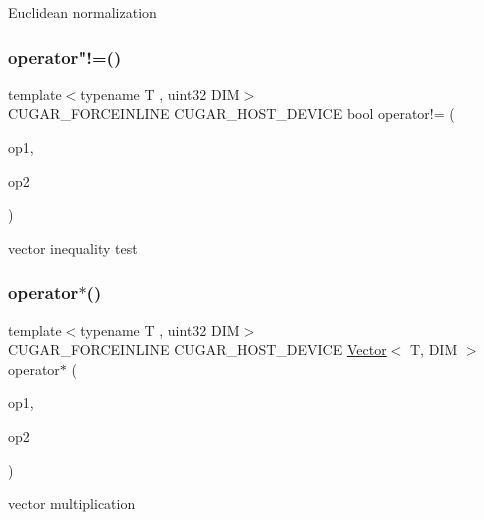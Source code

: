Euclidean normalization \mbox{\label{group___vectors_module_ga7d5781e9d1c69c0520c733fd15a64c32}} 
\subsubsection{\texorpdfstring{operator"!=()}{operator!=()}}
{\footnotesize\ttfamily template$<$typename T , uint32 D\+IM$>$ \\
C\+U\+G\+A\+R\+\_\+\+F\+O\+R\+C\+E\+I\+N\+L\+I\+NE C\+U\+G\+A\+R\+\_\+\+H\+O\+S\+T\+\_\+\+D\+E\+V\+I\+CE bool operator!= (\begin{DoxyParamCaption}\item[{const \hyperlink{structcugar_1_1_vector}{Vector}$<$ T, D\+IM $>$ \&}]{op1,  }\item[{const \hyperlink{structcugar_1_1_vector}{Vector}$<$ T, D\+IM $>$ \&}]{op2 }\end{DoxyParamCaption})\hspace{0.3cm}{\ttfamily [related]}}

vector inequality test \mbox{\label{group___vectors_module_ga88fb5d3e63998e36fea6139b6d042b7e}} 
\subsubsection{\texorpdfstring{operator$\ast$()}{operator*()}\hspace{0.1cm}{\footnotesize\ttfamily [1/3]}}
{\footnotesize\ttfamily template$<$typename T , uint32 D\+IM$>$ \\
C\+U\+G\+A\+R\+\_\+\+F\+O\+R\+C\+E\+I\+N\+L\+I\+NE C\+U\+G\+A\+R\+\_\+\+H\+O\+S\+T\+\_\+\+D\+E\+V\+I\+CE \hyperlink{structcugar_1_1_vector}{Vector}$<$ T, D\+IM $>$ operator$\ast$ (\begin{DoxyParamCaption}\item[{const \hyperlink{structcugar_1_1_vector}{Vector}$<$ T, D\+IM $>$ \&}]{op1,  }\item[{const \hyperlink{structcugar_1_1_vector}{Vector}$<$ T, D\+IM $>$ \&}]{op2 }\end{DoxyParamCaption})\hspace{0.3cm}{\ttfamily [related]}}

vector multiplication \mbox{\label{group___vectors_module_ga72ffd716dd8896e1d565483f4ff96a51}} 
